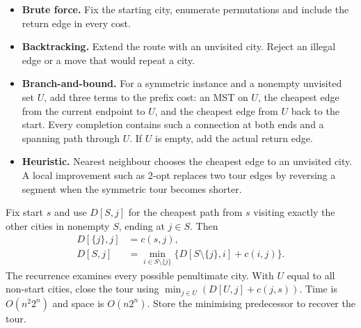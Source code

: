 \documentclass[12pt,a4paper]{article}
\begin{document}
\begin{itemize}[leftmargin=*, itemsep=3pt, topsep=4pt]
  \item \textbf{Brute force.} Fix the starting city, enumerate permutations and include the return edge in every cost.
  \item \textbf{Backtracking.} Extend the route with an unvisited city. Reject an illegal edge or a move that would repeat a city.
  \item \textbf{Branch-and-bound.} For a symmetric instance and a nonempty unvisited set $U$, add three terms to the prefix cost: an MST on $U$, the cheapest edge from the current endpoint to $U$, and the cheapest edge from $U$ back to the start. Every completion contains such a connection at both ends and a spanning path through $U$. If $U$ is empty, add the actual return edge.
  \item \textbf{Heuristic.} Nearest neighbour chooses the cheapest edge to an unvisited city. A local improvement such as 2-opt replaces two tour edges by reversing a segment when the symmetric tour becomes shorter.
\end{itemize}
\begin{tcolorbox}[formulabox, title={Held--Karp subset DP}]
Fix start $s$ and use $D[S,j]$ for the cheapest path from $s$ visiting exactly the other cities in nonempty $S$, ending at $j\in S$. Then
\begin{align*}
D[\{j\},j]&=c(s,j),\\
D[S,j]&=\min_{i\in S\setminus\{j\}}\{D[S\setminus\{j\},i]+c(i,j)\}.
\end{align*}
The recurrence examines every possible penultimate city. With $U$ equal to all non-start cities, close the tour using $\min_{j\in U}(D[U,j]+c(j,s))$. Time is $O(n^2 2^n)$ and space is $O(n2^n)$. Store the minimising predecessor to recover the tour.
\end{tcolorbox}
\end{document}
